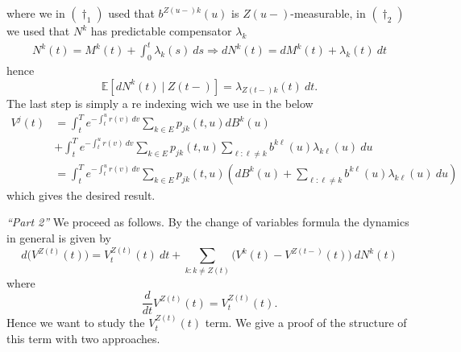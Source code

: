 \documentclass[
]{book}
\begin{document}
where we in \((\dagger_1)\) used that \(b^{Z(u-)k}(u)\) is \(Z(u-)\)-measurable, in \((\dagger_2)\) we used that \(N^k\) has predictable compensator \(\lambda_k\)
\begin{align*}
N^k(t)=M^k(t)+\int_0^t\lambda_k(s)\ ds\Rightarrow dN^k(t)=dM^k(t)+\lambda_k(t)\ dt
\end{align*}
hence
\[
\mathbb E[dN^k(t) \ \vert\ Z(t-)]=\lambda_{Z(t-)k}(t)\ dt.
\]
The last step is simply a re indexing wich we use in the below
\begin{align*}
V^j(t)&=\int_t^Te^{-\int_t^ur(v)\ dv}\sum_{k\in E}p_{jk}(t,u)d B^k(u)\\
&+\int_t^Te^{-\int_t^ur(v)\ dv}\sum_{k\in E}p_{jk}(t,u)\sum_{\ell :\ell \ne k}  b^{k\ell }(u)\lambda_{k\ell }(u)\ du\\
&=\int_t^Te^{-\int_t^ur(v)\ dv}\sum_{k\in E}p_{jk}(t,u)\left(d B^k(u)+\sum_{\ell :\ell \ne k}  b^{k\ell }(u)\lambda_{k\ell }(u)\ du\right)
\end{align*}
which gives the desired result.

\emph{``Part 2''} We proceed as follows. By the change of variables formula the dynamics in general is given by
\[
d\Big(V^{Z(t)}(t)\Big)=V_t^{Z(t)}(t)\ dt+\sum_{k: k\ne Z(t)}\Big(V^k(t)-V^{Z(t-)}(t)\Big)\ dN^k(t)
\]
where
\[
\frac{d}{dt}V^{Z(t)}(t)=V_t^{Z(t)}(t).
\]
Hence we want to study the \(V_t^{Z(t)}(t)\) term. We give a proof of the structure of this term with two approaches.
\end{document}
